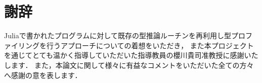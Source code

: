 
\section*{謝辞}

Juliaで書かれたプログラムに対して既存の型推論ルーチンを再利用し型プロファイリングを行うアプローチについての着想をいただき，
また本プロジェクトを通じてとても温かく指導していただいた指導教員の櫻川貴司准教授に感謝いたします．
また，本論文に関して様々に有益なコメントをいただいた全ての方々へ感謝の意を表します．
